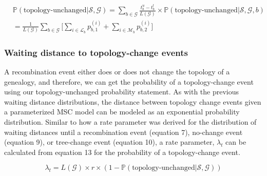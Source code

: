 \documentclass[11pt]{article}
\begin{document}
\begin{equation}
\begin{aligned}
	&\mathbb{P}(\textrm{topology-unchanged} | \mathcal{S},\mathcal{G})
	= \sum_{b \in \mathcal{G}}\frac{t_b^u - t_b^l}{L(\mathcal{G})} 
	\times 
	\mathbb{P}(\textrm{topology-unchanged} | \mathcal{S},\mathcal{G},b)
	\\
	&
	= \frac{1}{L(\mathcal{G})} \sum_{b \in \mathcal{G}}
	\bigg[ 
		\sum_{i \in \mathcal{L}_b} p_{b,1}^{(i)} +
		\sum_{i \in \mathcal{M}_b} p_{b,2}^{(i)}
	\bigg]
\end{aligned}
\end{equation}

\subsubsection{Waiting distance to topology-change events}
A recombination event either does or does not change the topology
of a genealogy, and therefore, we can get the probability of a 
topology-change event using our topology-unchanged probability statement.
As with the previous waiting distance distributions, the distance between
topology change events given a parameterized MSC model can be 
modeled as an exponential probability distribution. 
Similar to how a rate parameter was derived for the distribution 
of waiting distances until a recombination event (equation 7), 
no-change event (equation 9), or tree-change event (equation 10), 
a rate parameter, $\lambda_t$ can be calculated from equation 13 for 
the probability of a topology-change event. 

\begin{equation}
	\lambda_{t} = 
	L(\mathcal{G}) \times r \times 
	(1 - \mathbb{P}(\text{topology-unchanged} | \mathcal{S},\mathcal{G}))
\end{equation}





\end{document}
